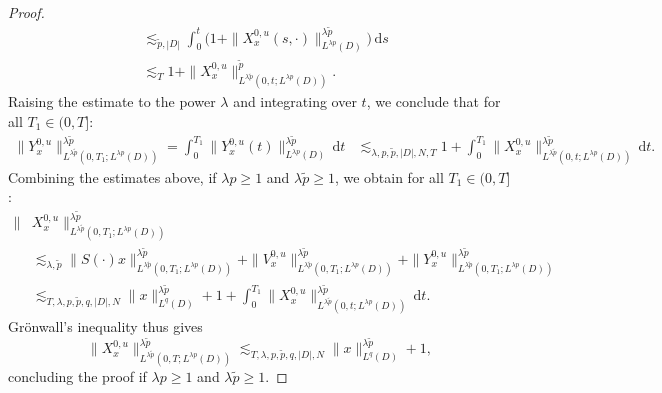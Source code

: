\documentclass[10pt,a4paper]{amsart}
\numberwithin{equation}{section}
\newcommand{\dd}{\,\mathrm{d}}
\begin{document}
\begin{proof}
\begin{align*}
  &\lesssim_{\tilde p,|D|} \int_0^t \big(1+\|X_x^{0,u}(s,\cdot)\|_{L^{\lambda p}(D)}^{\lambda \tilde p}\big)\dd s\\
  &\lesssim_{T } 1 +  \|X_x^{0,u}\|_{L^{\lambda\tilde p}(0,t; L^{\lambda p}(D))}^{  \tilde p}.
\end{align*}  
Raising the estimate to the power $\lambda$ and integrating over $t$, we conclude that for all $T_1\in(0,T]$:
\begin{align*}
\|Y_x^{0,u}\|_{L^{\lambda\tilde p}(0,T_1;L^{\lambda p}(D))}^{\lambda\tilde p}
=\int_0^{T_1}\|Y_x^{0,u}(t)\|_{L^{\lambda p}(D)}^{\lambda\tilde p}\dd t
&\lesssim_{\lambda,p,\tilde p,|D|,N,T} 1+
\int_0^{T_1}\|X_x^{0,u}\|_{L^{\lambda\tilde p}(0,t;L^{\lambda p}(D))}^{\lambda\tilde p} \dd t.
\end{align*} 
Combining the estimates above, if $\lambda p\geq 1$ and $\lambda\tilde p\geq 1$, we obtain for all $T_1\in(0,T]$:  
\begin{align*}
  \|&X_x^{0,u}\|_{L^{\lambda\tilde p}(0,{T_1};L^{\lambda p}(D))}^{\lambda\tilde p}\\
  &\lesssim_{\lambda,\tilde p}\|S(\cdot)x\|_{L^{\lambda\tilde p}(0,{T_1};L^{\lambda p}(D))}^{\lambda\tilde p}
  +\|V_x^{0,u}\|_{L^{\lambda\tilde p}(0,{T_1};L^{\lambda p}(D))}^{\lambda\tilde p}+\|Y_x^{0,u}\|_{L^{\lambda\tilde p}(0,{T_1};L^{\lambda p}(D))}^{\lambda\tilde p}\\
  &\lesssim_{T,\lambda,p,\tilde p,q,|D|,N}\|x\|_{L^q(D)}^{\lambda\tilde p}+ 1+
\int_0^{T_1}\|X_x^{0,u}\|_{L^{\lambda\tilde p}(0,t;L^{\lambda p}(D))}^{\lambda\tilde p} \dd t.
\end{align*}
Gr\"onwall's inequality thus gives  
\[
 \|X_x^{0,u}\|_{L^{\lambda\tilde p}(0,T;L^{\lambda p}(D))}^{\lambda\tilde p} 
  \lesssim_{T,\lambda,p,\tilde p,q,|D|,N}\|x\|_{L^q(D)}^{\lambda\tilde p}+ 1,
\]
concluding the proof if $\lambda p\geq 1$ and $\lambda\tilde p\geq 1$. 


\end{proof}
\end{document}

